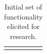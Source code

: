 \begin{longtable}[h!]{>{\raggedright\small}p{4.5in}c}
	


    \midrule
    \caption[]{\label{table:Stolk_thes-functionality:appendix:required}Initial set of functionality elicited for research.%
}
\end{longtable}

